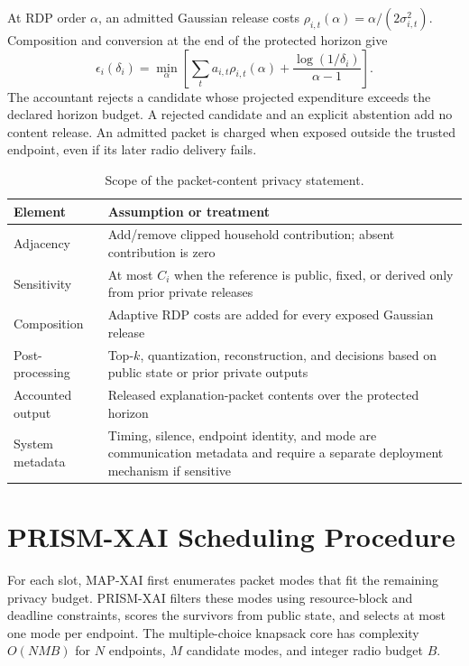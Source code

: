\documentclass[10pt,conference]{IEEEtran}
\begin{document}
At RDP order $\alpha$, an admitted Gaussian release costs
$\rho_{i,t}(\alpha)=\alpha/(2\sigma_{i,t}^2)$. Composition and conversion at
the end of the protected horizon give
\begin{equation}
\epsilon_i(\delta_i)=\min_{\alpha}
\left[\sum_t a_{i,t}\rho_{i,t}(\alpha)
+\frac{\log(1/\delta_i)}{\alpha-1}\right].
\end{equation}
The accountant rejects a candidate whose projected expenditure exceeds the
declared horizon budget. A rejected candidate and an explicit abstention add
no content release. An admitted packet is charged when exposed outside the
trusted endpoint, even if its later radio delivery fails.

\begin{table}[b]
\caption{Scope of the packet-content privacy statement.}
\label{tab:privacy}
\centering\small
\begin{tabular}{p{}p{}}
\toprule
Element & Assumption or treatment\\ \midrule
Adjacency & Add/remove clipped household contribution; absent contribution is zero\\
Sensitivity & At most $C_i$ when the reference is public, fixed, or derived only from prior private releases\\
Composition & Adaptive RDP costs are added for every exposed Gaussian release\\
Post-processing & Top-$k$, quantization, reconstruction, and decisions based on public state or prior private outputs\\
Accounted output & Released explanation-packet contents over the protected horizon\\
System metadata & Timing, silence, endpoint identity, and mode are communication metadata and require a separate deployment mechanism if sensitive\\
\bottomrule
\end{tabular}
\end{table}

\section{PRISM-XAI Scheduling Procedure}

For each slot, MAP-XAI first enumerates packet modes that fit the remaining
privacy budget. PRISM-XAI filters these modes using resource-block and deadline
constraints, scores the survivors from public state, and selects at most one
mode per endpoint. The multiple-choice knapsack core has complexity
$O(NMB)$ for $N$ endpoints, $M$ candidate modes, and integer radio budget $B$.
\end{document}
